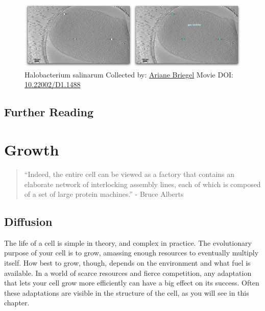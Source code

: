 \documentclass[]{tufte-book}
\begin{document}
\begin{figure}
\includegraphics{movie_stills/3_7a} \caption[Halobacterium salinarum Collected by:
\protect\hyperlink{ariane_briegel}{Ariane Briegel} Movie DOI:
\href{https://doi.org/10.22002/D1.1488}{10.22002/D1.1488}]{Halobacterium salinarum Collected by:
\protect\hyperlink{ariane_briegel}{Ariane Briegel} Movie DOI:
\href{https://doi.org/10.22002/D1.1488}{10.22002/D1.1488}}\label{fig:3-7a}
\end{figure}

\section{Further Reading}\label{further-reading-2}

\citep{barry2011}

\citep{pfeifer2012}

\citep{pilhofer2013}

\citep{young2006}

\chapter{Growth}\label{growth}

\begin{quote}
``Indeed, the entire cell can be viewed as a factory that contains an
elaborate network of interlocking assembly lines, each of which is
composed of a set of large protein machines.'' - Bruce Alberts
\citep{alberts1998}
\end{quote}

\section{Diffusion}\label{diffusion}

The life of a cell is simple in theory, and complex in practice. The
evolutionary purpose of your cell is to grow, amassing enough resources
to eventually multiply itself. How best to grow, though, depends on the
environment and what fuel is available. In a world of scarce resources
and fierce competition, any adaptation that lets your cell grow more
efficiently can have a big effect on its success. Often these
adaptations are visible in the structure of the cell, as you will see in
this chapter.
\end{document}
